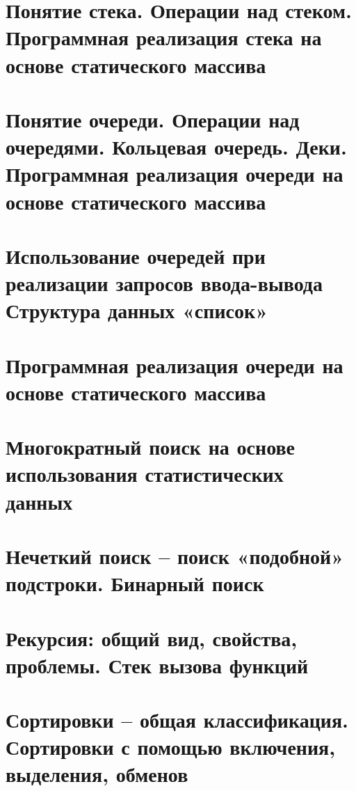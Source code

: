 \section{Понятие стека. Операции над стеком. Программная реализация стека на основе статического массива}
\section{Понятие очереди. Операции над очередями. Кольцевая очередь. Деки.  Программная реализация очереди на основе статического массива}
\section{Использование очередей при реализации запросов ввода-вывода Структура данных «список»}
\section{Программная реализация очереди на основе статического массива}
\section{Многократный поиск на основе использования статистических данных}
\section{Нечеткий поиск – поиск «подобной» подстроки. Бинарный поиск}
\section{Рекурсия: общий вид, свойства, проблемы. Стек вызова функций}
\section{Сортировки – общая классификация. Сортировки с помощью включения, выделения, обменов}
